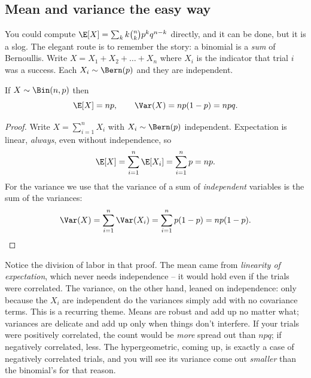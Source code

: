 \subsection{Mean and variance the easy way}
\label{ch07:binom-moments}

You could compute $\E[X] = \sum_k k \binom{n}{k} p^k q^{n-k}$ directly, and it can
be done, but it is a slog. The elegant route is to remember the story: a binomial
is a \emph{sum} of Bernoullis. Write $X = X_1 + X_2 + \dots + X_n$ where $X_i$ is
the indicator that trial $i$ was a success. Each $X_i \sim \Bern(p)$ and they are
independent.

\begin{proposition}
\label{ch07:binom-mv}
If $X \sim \Bin(n,p)$ then
\[
  \E[X] = np, \qquad \Var(X) = np(1-p) = npq.
\]
\end{proposition}

\begin{proof}
Write $X = \sum_{i=1}^{n} X_i$ with $X_i \sim \Bern(p)$ independent. Expectation
is linear, \emph{always}, even without independence, so
\[
  \E[X] = \sum_{i=1}^{n} \E[X_i] = \sum_{i=1}^{n} p = np.
\]
For the variance we use that the variance of a sum of \emph{independent} variables
is the sum of the variances:
\[
  \Var(X) = \sum_{i=1}^{n} \Var(X_i) = \sum_{i=1}^{n} p(1-p) = np(1-p). \qedhere
\]
\end{proof}

\begin{happeningbox}
Notice the division of labor in that proof. The mean came from \emph{linearity of
expectation}, which never needs independence -- it would hold even if the trials
were correlated. The variance, on the other hand, leaned on independence: only
because the $X_i$ are independent do the variances simply add with no covariance
terms. This is a recurring theme. Means are robust and add up no matter what;
variances are delicate and add up only when things don't interfere. If your
trials were positively correlated, the count would be \emph{more} spread out than
$npq$; if negatively correlated, less. The hypergeometric, coming up, is exactly a
case of negatively correlated trials, and you will see its variance come out
\emph{smaller} than the binomial's for that reason.
\end{happeningbox}

